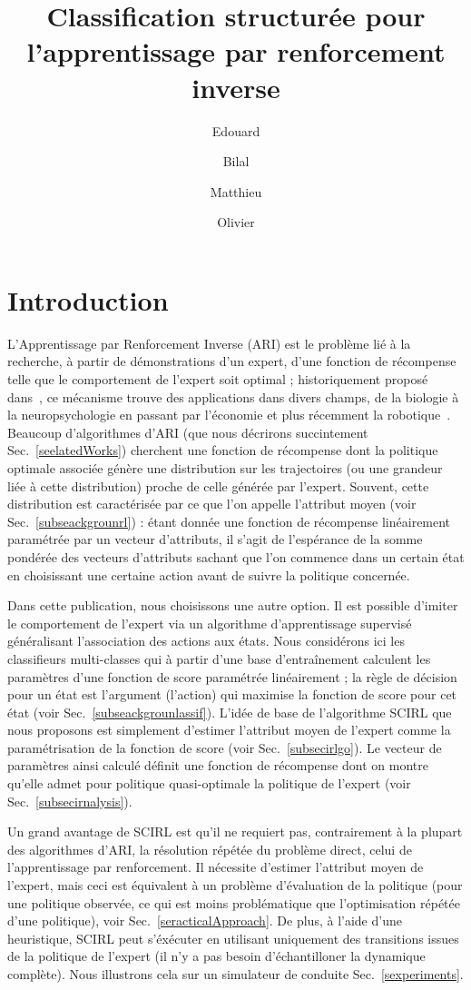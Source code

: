 \documentclass[french,utf8]{./hermes-journal}
\title[SCIRL]{Classification structurée pour l'apprentissage par renforcement inverse}
\author[1,2]{Edouard}{Klein}
\author[2,3]{Bilal}{Piot}
\author[2]{Matthieu}{Geist}
\author[2,3]{Olivier}{Pietquin}
\begin{document}
\maketitle

\newpage
\section{Introduction}
\label{sentro}

L'Apprentissage par Renforcement Inverse (ARI) est le problème lié à la recherche, à partir de démonstrations d'un expert, d'une fonction de récompense telle que le comportement de l'expert soit optimal ; historiquement proposé dans~\cite{Russel998}, ce mécanisme trouve des applications dans divers champs, de la biologie à la neuropsychologie en passant par l'économie et plus récemment la robotique~\cite{abbeel2010autonomous}. Beaucoup d'algorithmes d'ARI (que nous décrirons succintement Sec.~\ref{seelatedWorks}) cherchent une fonction de récompense dont la politique optimale associée génère une distribution sur les trajectoires (ou une grandeur liée à cette distribution) proche de celle générée par l'expert. Souvent, cette distribution est caractérisée par ce que l'on appelle l'attribut moyen (voir Sec.~\ref{subseackgrounrl}) : étant donnée une fonction de récompense linéairement paramétrée par un vecteur d'attributs, il s'agit de l'espérance de la somme pondérée des vecteurs d'attributs sachant que l'on commence dans un certain état en choisissant une certaine action avant de suivre la politique concernée.

Dans cette publication, nous choisissons une autre option. Il est possible d'imiter le comportement de l'expert via un algorithme d'apprentissage supervisé généralisant l'association des actions aux états. Nous considérons ici les classifieurs multi-classes qui à partir d'une base d'entraînement calculent les paramètres d'une fonction de score paramétrée linéairement ; la règle de décision pour un état est l'argument (l'action) qui maximise la fonction de score pour cet état (voir Sec.~\ref{subseackgrounlassif}). L'idée de base de l'algorithme SCIRL que nous proposons est simplement d'estimer l'attribut moyen de l'expert comme la paramétrisation de la fonction de score (voir Sec.~\ref{subsecirlgo}). Le vecteur de paramètres ainsi calculé définit une fonction de récompense dont on montre qu'elle admet pour politique quasi-optimale la politique de l'expert (voir Sec.~\ref{subsecirnalysis}).

Un grand avantage de SCIRL est qu'il ne requiert pas, contrairement à la plupart des algorithmes d'ARI, la résolution répétée du problème direct, celui de l'apprentissage par renforcement. Il nécessite d'estimer l'attribut moyen de l'expert, mais ceci est équivalent à un problème d'évaluation de la politique (pour une politique observée, ce qui est moins problématique que l'optimisation répétée d'une politique), voir Sec.~\ref{seracticalApproach}.
De plus, à l'aide d'une heuristique, SCIRL peut s'éxécuter en utilisant uniquement des transitions issues de la politique de l'expert (il n'y a pas besoin d'échantilloner la dynamique complète). Nous illustrons cela sur un simulateur de conduite Sec.~\ref{sexperiments}.
\end{document}
